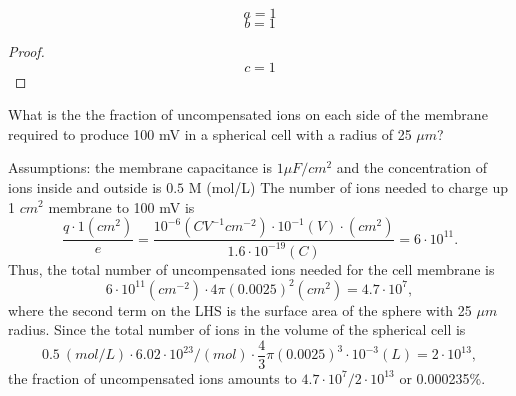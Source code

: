 \begin{theorem}[Name 1]
    \begin{example}[Name 2]
        \[
            a = 1
        \]
        \[
            b = 1
        \]
    \end{example}

    \begin{proof}
        \[
            c = 1
        \]
    \end{proof}
\end{theorem}

%
%

\begin{example}

    \noindent
    What is the the fraction of uncompensated ions on each side of the
    membrane required to produce 100 mV in a spherical cell with
    a radius of 25 $\mu m$?

    Assumptions: the membrane capacitance is $1 \mu F/cm^2$ and the concentration of ions inside and outside is $0.5$ M (mol/L)
    The number of ions needed to charge up 1 $cm^2$ membrane
    to 100 mV is
    \[
    \frac{q \cdot 1 (cm^2)}{e} = \frac{10^{-6}(C V^{-1} cm^{-2}) \cdot
    10^{-1} (V) \cdot (cm^2)}{1.6 \cdot 10^{-19}(C)} = 6 \cdot 10^{11} .
    \]
    Thus, the total number of uncompensated ions needed for the
    cell membrane is
    \[
    6 \cdot 10^{11} (cm^{-2}) \cdot 4 \pi (0.0025)^2 (cm^2) =
    4.7 \cdot 10^7 ,
    \]
    where the second term on the LHS is the surface area of the sphere
    with 25 $\mu m$ radius.
    Since the total number of ions in the volume of the spherical cell is
    \[
    0.5 ~(mol/L) \cdot 6.02 \cdot 10^{23} / (mol)
    \cdot \frac{4}{3} \pi (0.0025)^3 \cdot 10^{-3} (L) = 2\cdot 10^{13},
    \]
    the fraction of uncompensated ions amounts to
    $4.7 \cdot 10^7 / 2 \cdot 10^{13}$ or 0.000235\%.
\end{example}


